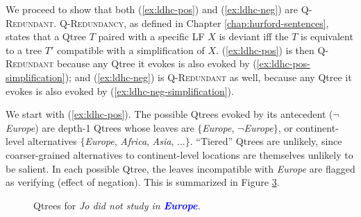 We proceed to show that both (\ref{ex:ldhc-pos}) and (\ref{ex:ldhc-neg}) are \textsc{Q-Redundant}. \textsc{Q-Redundancy}, as defined in Chapter \ref{chap:hurford-sentences}, states that a Qtree $T$ paired with a specific LF $X$ is deviant iff the $T$ is equivalent to a tree $T'$ compatible with a simplification of $X$. (\ref{ex:ldhc-pos}) is then \textsc{Q-Redundant} because any Qtree it evokes is also evoked by (\ref{ex:ldhc-pos-simplification}); and (\ref{ex:ldhc-neg}) is \textsc{Q-Redundant} as well, because any Qtree it evokes is also evoked by (\ref{ex:ldhc-neg-simplification}).

\begin{exe}
	\ex\label{ex:ldhc-simplifications}
	\begin{xlist}
		\label{ex:ldhc-pos-simplification}
		\label{ex:ldhc-neg-simplification}
	\end{xlist}
\end{exe}

We start with (\ref{ex:ldhc-pos}). The possible Qtrees evoked by its antecedent ($\neg$\textit{Europe}) are depth-1 Qtrees whose leaves are $\lbrace$\textit{Europe}, $\neg$\textit{Europe}$\rbrace$, or continent-level alternatives $\lbrace$\textit{Europe}, \textit{Africa}, \textit{Asia}, ...$\rbrace$. ``Tiered'' Qtrees are unlikely, since coarser-grained alternatives to continent-level locations are themselves unlikely to be salient. In each possible Qtree, the leaves incompatible with \textit{Europe} are flagged as verifying (effect of negation). This is summarized in Figure \ref{trees:not-Europe}.

\begin{figure}[H]
	\centering
	\begin{subfigure}[b]{.3\linewidth}
		\centering
		\caption{}\label{tree:not-europe-polar}
	\end{subfigure}
	\qquad
	\begin{subfigure}[b]{.3\linewidth}
		\centering
		\caption{}\label{tree:not-europe-wh}
	\end{subfigure}
	\caption{Qtrees for \textit{Jo did not study in \textcolor{blue}{\textbf{Europe}}.}}\label{trees:not-Europe}
\end{figure}

